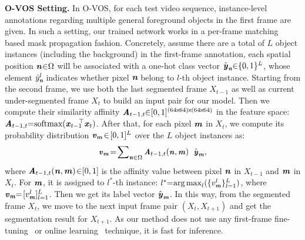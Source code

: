 \documentclass[10pt,twocolumn,letterpaper]{article}
\begin{document}
\noindent\textbf{O-VOS Setting.} In O-VOS, for each test video sequence, instance-level annotations regarding multiple general foreground objects in the first frame are given.  In such a setting, our trained network works in a per-frame matching based mask propagation fashion. Concretely, assume there are a total of $L$ object instances (including the background) in the first-frame annotation, each spatial position $\textbf{\textit{n}}_{\!}\!\in_{\!}\!\Omega$ will be associated with a one-hot class vector $\hat{\textbf{\textit{y}}}_{\textbf{\textit{n}}\!}\!\in_{\!}\!\{0,1\}^L$, whose element $\hat{y}^l_{\textbf{\textit{n}}\!}$ indicates whether pixel $\textbf{\textit{n}}_{\!}$ belong to $l$-th object instance. Starting from the second frame, we use both the last segmented frame $X_{t-1}$ as well as current under-segmented frame $X_{t}$ to build an input pair for our model. Then we compute their similarity affinity $\textbf{\textit{A}}_{t-1,t\!}\!\in_{\!}\![0, 1]^{(64\!\times\!64)\!\times\!(64\!\times\!64)}$ in the feature space: $\textbf{\textit{A}}_{t-1,t\!}\!=_{\!}\!\text{softmax}({\textbf{\textit{x}}_{t-1}}^{\!\!\!\top}\textbf{\textit{x}}_{t})$. After that, for each pixel $\textbf{\textit{m}}$ in $X_{t}$, we compute its probability distribution $\textbf{\textit{v}}_{\textbf{\textit{m}}}\!\in\![0,1]^L$ over the $L$ object instances as:
\vspace{-2pt}
\begin{equation}\small
\textbf{\textit{v}}_{\textbf{\textit{m}}}\!=\!\sum\nolimits_{\textbf{\textit{n}}\in\Omega}\textbf{\textit{A}}_{t-1,t}(\textbf{\textit{n}},\textbf{\textit{m}})~~\hat{\textbf{\textit{y}}}_{\textbf{\textit{m}}},
\vspace{-1pt}
\end{equation}
where $\textbf{\textit{A}}_{t-1,t}(\textbf{\textit{n}}, \textbf{\textit{m}})\!\in_{\!}\![0,1]_{\!}$ is the affinity value between pixel $\textbf{\textit{n}}$ in $X_{t-1}$ and $\textbf{\textit{m}}$ in $X_t$.  For $\textbf{\textit{m}}$, it is assigned to $l^{*\!}$-th instance: $l^{*\!}\!=_{\!}\!\mathop{\arg\max}_l(\{v^l_{\textbf{\textit{m}}}\}_{l=1}^L)$, where $\textbf{\textit{v}}_{\textbf{\textit{m}}\!}\!=\![v^l_{\textbf{\textit{m}}}]_{l=1}^L$. Then we get its label vector $\hat{\textbf{\textit{y}}}_{\textbf{\textit{m}}}$. In this way, from the segmented frame $X_{t}$, we move to the next input frame pair $(X_{t},X_{t+1})$ and get the segmentation result for $X_{t+1}$. As our method does not use any first-frame fine-tuning~\!\cite{cheng2017segflow,DBLP:conf/cvpr/PerazziKBSS17} or online learning~\cite{voigtlaender2017online} technique, it is fast for inference.
\end{document}
